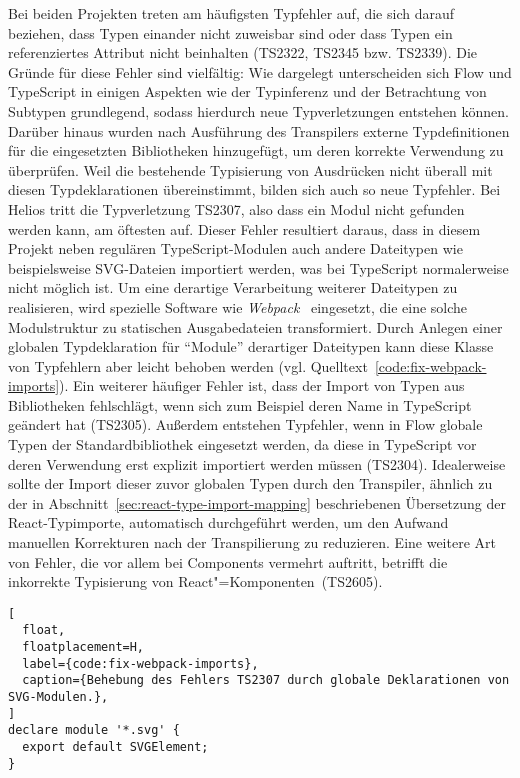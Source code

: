 Bei beiden Projekten treten am häufigsten Typfehler auf, die sich darauf beziehen, dass Typen einander nicht zuweisbar sind oder dass Typen ein referenziertes Attribut nicht beinhalten (TS2322, TS2345 bzw. TS2339). Die Gründe für diese Fehler sind vielfältig: Wie dargelegt unterscheiden sich Flow und TypeScript in einigen Aspekten wie der Typinferenz und der Betrachtung von Subtypen grundlegend, sodass hierdurch neue Typverletzungen entstehen können. Darüber hinaus wurden nach Ausführung des Transpilers externe Typdefinitionen für die eingesetzten Bibliotheken hinzugefügt, um deren korrekte Verwendung zu überprüfen. Weil die bestehende Typisierung von Ausdrücken nicht überall mit diesen Typdeklarationen übereinstimmt, bilden sich auch so neue Typfehler. Bei Helios tritt die Typverletzung TS2307, also dass ein Modul nicht gefunden werden kann, am öftesten auf. Dieser Fehler resultiert daraus, dass in diesem Projekt neben regulären TypeScript-Modulen auch andere Dateitypen wie beispielsweise SVG-Dateien importiert werden, was bei TypeScript normalerweise nicht möglich ist. Um eine derartige Verarbeitung weiterer Dateitypen zu realisieren, wird spezielle Software wie \textit{Webpack}~\autocite{WEBPACK} eingesetzt, die eine solche Modulstruktur zu statischen Ausgabedateien transformiert. Durch Anlegen einer globalen Typdeklaration für \enquote{Module} derartiger Dateitypen kann diese Klasse von Typfehlern aber leicht behoben werden (vgl. Quelltext~\ref{code:fix-webpack-imports}). Ein weiterer häufiger Fehler ist, dass der Import von Typen aus Bibliotheken fehlschlägt, wenn sich zum Beispiel deren Name in TypeScript geändert hat (TS2305). Außerdem entstehen Typfehler, wenn in Flow globale Typen der Standardbibliothek eingesetzt werden, da diese in TypeScript vor deren Verwendung erst explizit importiert werden müssen (TS2304). Idealerweise sollte der Import dieser zuvor globalen Typen durch den Transpiler, ähnlich zu der in Abschnitt~\ref{sec:react-type-import-mapping} beschriebenen Übersetzung der React-Typimporte, automatisch durchgeführt werden, um den Aufwand manuellen Korrekturen nach der Transpilierung zu reduzieren. Eine weitere Art von Fehler, die vor allem bei Components vermehrt auftritt, betrifft die inkorrekte Typisierung von React"=Komponenten~(TS2605).

\begin{lstlisting}[
  float,
  floatplacement=H,
  label={code:fix-webpack-imports},
  caption={Behebung des Fehlers TS2307 durch globale Deklarationen von SVG-Modulen.},
]
declare module '*.svg' {
  export default SVGElement;
}
\end{lstlisting}

